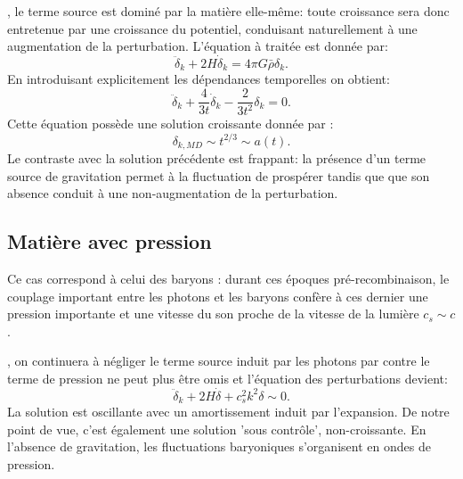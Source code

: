 , le terme source est dominé par la matière elle-même: toute croissance sera donc entretenue par une croissance du potentiel, conduisant naturellement à une augmentation de la perturbation. L'équation à traitée est donnée par:
\begin{equation}
\ddot \delta_k +2 H \dot \delta_k =4\pi G \bar\rho \delta_k.
\end{equation}
En introduisant explicitement les dépendances temporelles on obtient:
\begin{equation}
\ddot \delta_k +\frac{4}{3t}\dot \delta_k - \frac{2}{3t^2}\delta_k=0.
\end{equation}
Cette équation possède une solution croissante donnée par  :
\begin{equation}
\delta_{k,MD}\sim t^{2/3}\sim a(t).
\end{equation}
Le contraste avec la solution précédente est frappant: la présence d'un terme source de gravitation permet à la fluctuation de prospérer tandis que que son absence conduit à une non-augmentation de la perturbation.

\subsection{Matière avec pression}
Ce cas correspond à celui des baryons : durant ces époques pré-recombinaison, le couplage important entre les photons et les baryons confère à ces dernier une pression importante et une vitesse du son proche de la vitesse de la lumière $c_s\sim c$.

, on continuera à négliger le terme source induit par les photons par contre le terme de pression ne peut plus être omis et l'équation des perturbations devient:
\begin{equation}
\ddot \delta_k+2H\dot \delta +c_s^2k^2 \delta \sim 0.
\end{equation}
La solution est oscillante avec un amortissement induit par l'expansion. De notre point de vue, c'est également une solution 'sous contrôle', non-croissante. En l'absence de gravitation, les fluctuations baryoniques s'organisent en ondes de pression.

